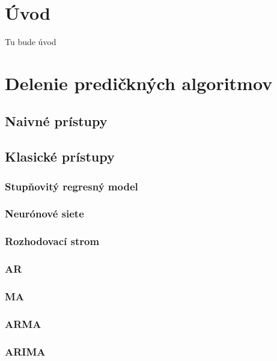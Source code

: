 \documentclass[12pt,oneside,slovak,a4paper]{book}
\begin{document}
\chapter{Úvod}
Tu bude úvod


\chapter{Delenie predičkných algoritmov}

\section{Naivné prístupy}
\subsection{}


\section{Klasické prístupy}

\subsection{Stupňovitý regresný model}
\subsection{Neurónové siete}
\subsection{Rozhodovací strom}
\subsection{AR}
\subsection{MA}
\subsection{ARMA}
\subsection{ARIMA}
\end{document}

